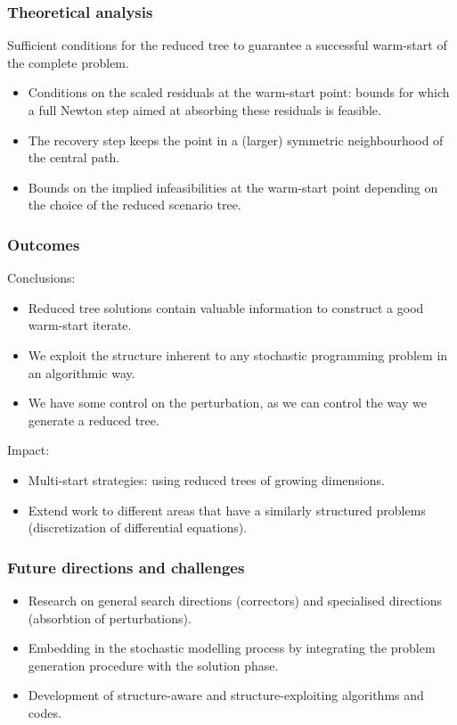 \documentclass{beamer}
\begin{document}
\frame
{
  \frametitle{Theoretical analysis}

  Sufficient conditions for the reduced tree to guarantee a successful 
  warm-start of the complete problem.

  \begin{itemize}
  \item Conditions on the scaled residuals at the warm-start point: bounds
    for which a full Newton step aimed at absorbing these residuals is
    feasible.
  \item The recovery step keeps the point in a (larger) symmetric neighbourhood
    of the central path.
  \item Bounds on the implied infeasibilities at the warm-start point
    depending on the choice of the reduced scenario tree.

  \end{itemize}
}

\frame
{

  \frametitle{Outcomes}

  Conclusions:
  \begin{itemize}
  \item Reduced tree solutions contain valuable information to construct 
    a good warm-start iterate.
  \item We exploit the structure inherent to any stochastic programming problem
    in an algorithmic way.
  \item We have some control on the perturbation, as we can control the way
    we generate a reduced tree.
  \end{itemize}

  \vfill
  Impact:
  \begin{itemize}
  \item Multi-start strategies: using reduced trees of growing dimensions.
  \item Extend work to different areas that have a similarly structured
    problems (discretization of differential equations).
  \end{itemize}
}

\frame
{
  \frametitle{Future directions and challenges}

  \begin{itemize}
  \item Research on general search directions (correctors) and specialised
    directions (absorbtion of perturbations).
  \item Embedding in the stochastic modelling process by integrating the
    problem generation procedure with the solution phase.
  \item Development of structure-aware and structure-exploiting algorithms
    and codes.
  \end{itemize}
}

%
%
\end{document}

